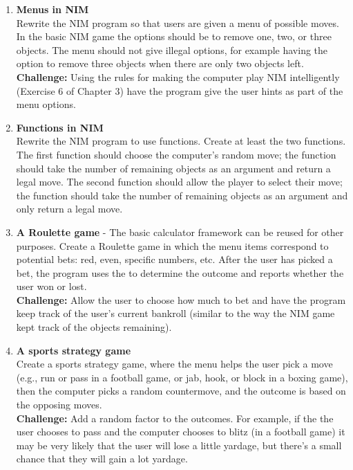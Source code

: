 \begin{enumerate}[{\bf 1.}]
\item {\bf Menus in NIM}\\
Rewrite the NIM program so that users are given a menu of possible moves.  In the basic NIM game the options should be to remove one, two, or three objects.  The menu should not give illegal options, for example having the option to remove three objects when there are only two objects left.\\
{\bf Challenge:} Using the rules for making the computer play NIM intelligently (Exercise 6 of Chapter 3) have the program give the user hints as part of the menu options. 

\item {\bf Functions in NIM}\\
Rewrite the NIM program to use functions.  Create at least the two functions.  The first function should choose the computer's random move; the function should take the number of remaining objects as an argument and return a legal move.  The second function should allow the player to select their move; the function should take the number of remaining objects as an argument and only return a legal move.  

\item {\bf A Roulette game} - The basic calculator framework can be reused for other purposes.  Create a Roulette game in which the menu items correspond to potential bets: red, even, specific numbers, etc.  After the user has picked a bet, the program uses the  to determine the outcome and reports whether the user won or lost.  \\
{\bf Challenge:} Allow the user to choose how much to bet and have the program keep track of the user's current bankroll (similar to the way the NIM game kept track of the objects remaining).

\item {\bf A sports strategy game} \\
Create a sports strategy game, where the menu helps the user pick a move (e.g., run or pass in a football game, or jab, hook, or block in a boxing game), then the computer picks a random countermove, and the outcome is based on the opposing moves.\\
{\bf Challenge:} Add a random factor to the outcomes.  For example, if the the user chooses to pass and the computer chooses to blitz (in a football game) it may be very likely that the user will lose a little yardage, but there's a small chance that they will gain a lot yardage.
\end{enumerate}
